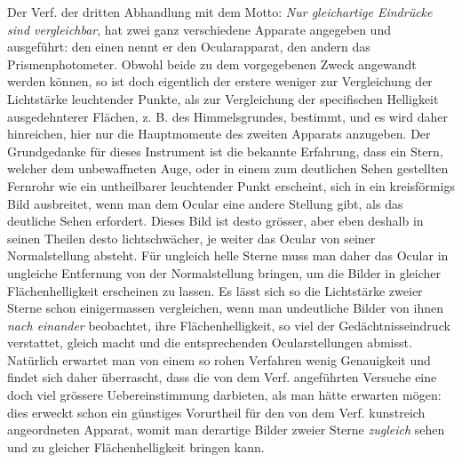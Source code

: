 Der Verf. der dritten Abhandlung mit dem Motto: \emph{Nur gleichartige Eindrücke sind vergleichbar}, hat zwei ganz verschiedene Apparate angegeben und ausgeführt: den einen nennt er den Ocularapparat, den andern das Prismenphotometer. Obwohl beide zu dem vorgegebenen Zweck angewandt werden können, so ist doch eigentlich der erstere weniger zur Vergleichung der Lichtstärke leuchtender Punkte, als zur Vergleichung der specifischen Helligkeit ausgedehnterer Flächen, z. B. des Himmelsgrundes, bestimmt, und es wird daher hinreichen, hier nur die Hauptmomente des zweiten Apparats anzugeben. Der Grundgedanke für dieses Instrument ist die bekannte Erfahrung, dass ein Stern, welcher dem unbewaffneten Auge, oder in einem zum deutlichen Sehen gestellten Fernrohr wie ein untheilbarer leuchtender Punkt erscheint, sich in ein kreisförmigs Bild ausbreitet, wenn man dem Ocular eine andere Stellung gibt, als das deutliche Sehen erfordert. Dieses Bild ist desto grösser, aber eben deshalb in seinen Theilen desto lichtschwächer, je weiter das Ocular von seiner Normalstellung absteht. Für ungleich helle Sterne muss man daher das Ocular in ungleiche Entfernung von der Normalstellung bringen, um die Bilder in gleicher Flächenhelligkeit erscheinen zu lassen. Es lässt sich so die Lichtstärke zweier Sterne schon einigermassen vergleichen, wenn man undeutliche Bilder von ihnen \emph{nach einander} beobachtet, ihre Flächenhelligkeit, so viel der Gedächtnisseindruck verstattet, gleich macht und die entsprechenden Ocularstellungen abmisst. Natürlich erwartet man von einem so rohen Verfahren wenig Genauigkeit und findet sich daher überrascht, dass die von dem Verf. angeführten Versuche eine doch viel grössere Uebereinstimmung darbieten, als man hätte erwarten mögen: dies erweckt schon ein günstiges Vorurtheil für den von dem Verf. kunstreich angeordneten Apparat, womit man derartige Bilder zweier Sterne \emph{zugleich} sehen und zu gleicher Flächenhelligkeit bringen kann.

